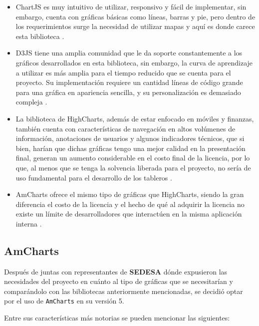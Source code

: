 \begin{itemize}
    \item ChartJS es muy intuitivo de utilizar, responsivo y fácil de implementar, sin embargo, cuenta con gráficas básicas como líneas, barras y pie, pero dentro de los requerimientos surge la necesidad de utilizar mapas y aquí es donde carece esta biblioteca \cite{chartjs_docs}.

    \item D3JS tiene una amplia comunidad que le da soporte constantemente a los gráficos desarrollados en esta biblioteca, sin embargo, la curva de aprendizaje a utilizar es más amplia para el tiempo reducido que se cuenta para el proyecto. Su implementación requiere un cantidad líneas de código grande para una gráfica en apariencia sencilla, y su personalización es demasiado compleja \cite{d3js_what_is_d3}.

    \item La biblioteca de HighCharts, además de estar enfocado en móviles y finanzas, también cuenta con características de navegación en altos volúmenes de información, anotaciones de usuarios y algunos indicadores técnicos, que si bien, harían que dichas gráficas tengo una mejor calidad en la presentación final, generan un aumento considerable en el costo final de la licencia, por lo que, al menos que se tenga la solvencia liberada para el proyecto, no sería de uso fundamental para el desarrollo de los tableros \cite{highcharts}.

    \item AmCharts ofrece el mismo tipo de gráficas que HighCharts, siendo la gran diferencia el costo de la licencia y el hecho de qué al adquirir la licencia no existe un límite de desarrolladores que interactúen en la misma aplicación interna \cite{amcharts_about}.
\end{itemize}


\subsection{AmCharts}

Después de juntas con representantes de \textbf{SEDESA} dónde expusieron las necesidades del proyecto en cuánto al tipo de gráficas que se necesitarían y comparándolo con las bibliotecas anteriormente mencionadas, se decidió optar por el uso de \texttt{AmCharts} en su versión 5.

Entre sus características más notorias se pueden mencionar las siguientes:

